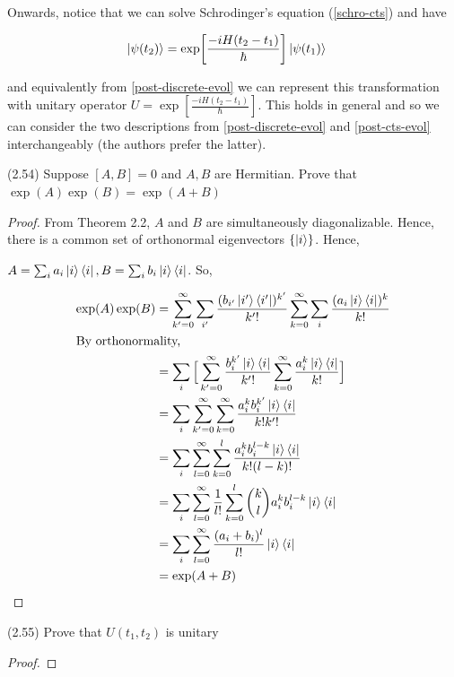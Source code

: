 \documentclass[main.tex]{subfiles}
\begin{document}
\begin{subappendices}
Onwards, notice that we can solve Schrodinger's equation (\ref{schro-cts}) and have

\begin{align*}
	\ket{\psi(t_2)} &= \exp[\frac{-iH(t_2 - t_1)}{\hbar}] \ket{\psi(t_1)}
\end{align*}

and equivalently from \ref{post-discrete-evol} we can represent this transformation with unitary operator $U = \exp[\frac{-iH(t_2 - t_1)}{\hbar}]$. This holds in general and so we can consider the two descriptions from \ref{post-discrete-evol} and \ref{post-cts-evol} interchangeably (the authors prefer the latter). 

\begin{exercise}
(2.54) Suppose $[A, B] = 0$ and $A, B$ are Hermitian. Prove that $\exp(A)\exp(B) = \exp(A + B)$

\begin{proof}
	From Theorem 2.2, $A$ and $B$ are simultaneously diagonalizable. Hence, there is a common set of orthonormal eigenvectors $\{ \ket{i} \}$. Hence,
	
	$A = \sum_i a_i \ket{i}\bra{i}, B = \sum_i b_i \ket{i}\bra{i}$. So, 
	
	\begin{align*}
	\exp(A)\exp(B) &= \sum_{k'=0}^\infty\sum_{i'} \frac{(b_{i'} \ket{i'}\bra{i'})^{k'}}{k'!}\sum_{k=0}^\infty\sum_{i} \frac{(a_i \ket{i}\bra{i})^k}{k!} \\
	\intertext{By orthonormality,}
	&= \sum_{i}\Big[\sum_{k'=0}^\infty \frac{b_i^{k'} \ket{i}\bra{i}}{k'!}\sum_{k=0}^\infty \frac{a_i^k \ket{i}\bra{i}}{k!}\Big] \\
	&= \sum_{i}\sum_{k'=0}^\infty\sum_{k=0}^\infty \frac{a_i^k b_i^{k'} \ket{i}\bra{i}}{k!k'!}\\
	&= \sum_{i}\sum_{l=0}^\infty\sum_{k=0}^l \frac{a_i^k b_i^{l-k} \ket{i}\bra{i}}{k!(l-k)!}\\
	&= \sum_{i}\sum_{l=0}^\infty \frac{1}{l!}\sum_{k=0}^l \binom{k}{l} a_i^k b_i^{l-k} \ket{i}\bra{i} \\
	&= \sum_{i}\sum_{l=0}^\infty \frac{(a_i +b_i)^l}{l!} \ket{i}\bra{i} \\
	&= \exp(A + B)
	\end{align*}
\end{proof}
\end{exercise}

\begin{exercise}
(2.55) Prove that $U(t_1, t_2)$ is unitary	
\begin{proof}


\end{proof}
\end{exercise}
\end{subappendices}
\end{document}
